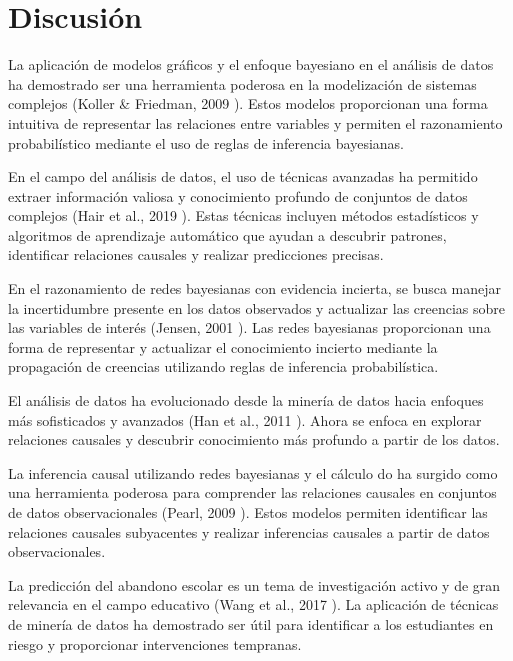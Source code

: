\hypertarget{discusiuxf3n}{%
    \section{Discusión}\label{discusiuxf3n}}

La aplicación de modelos gráficos y el enfoque bayesiano en el análisis de datos ha demostrado ser una herramienta poderosa
en la modelización de sistemas complejos (Koller \& Friedman, 2009 \cite{koller2009introduction}). Estos modelos proporcionan
una forma intuitiva de representar las relaciones entre variables y permiten el razonamiento probabilístico mediante el uso de reglas de inferencia bayesianas.

En el campo del análisis de datos, el uso de técnicas avanzadas ha permitido extraer información valiosa y conocimiento profundo de conjuntos
de datos complejos (Hair et al., 2019 \cite{hair2019advanced}). Estas técnicas incluyen métodos estadísticos y algoritmos de aprendizaje
automático que ayudan a descubrir patrones, identificar relaciones causales y realizar predicciones precisas.

En el razonamiento de redes bayesianas con evidencia incierta, se busca manejar la incertidumbre presente en los datos observados y
actualizar las creencias sobre las variables de interés (Jensen, 2001 \cite{jensen2001bayesian}). Las redes bayesianas proporcionan
una forma de representar y actualizar el conocimiento incierto mediante la propagación de creencias utilizando reglas de inferencia probabilística.

El análisis de datos ha evolucionado desde la minería de datos hacia enfoques más sofisticados y avanzados (Han et al., 2011 \cite{han2011data}).
Ahora se enfoca en explorar relaciones causales y descubrir conocimiento más profundo a partir de los datos.

La inferencia causal utilizando redes bayesianas y el cálculo do ha surgido como una herramienta poderosa para comprender las relaciones
causales en conjuntos de datos observacionales (Pearl, 2009 \cite{pearl2009introduction}). Estos modelos permiten identificar las relaciones
causales subyacentes y realizar inferencias causales a partir de datos observacionales.

La predicción del abandono escolar es un tema de investigación activo y de gran relevancia en el campo educativo (Wang et al., 2017 \cite{wang2017literature}).
La aplicación de técnicas de minería de datos ha demostrado ser útil para identificar a los estudiantes en riesgo y proporcionar intervenciones tempranas.

